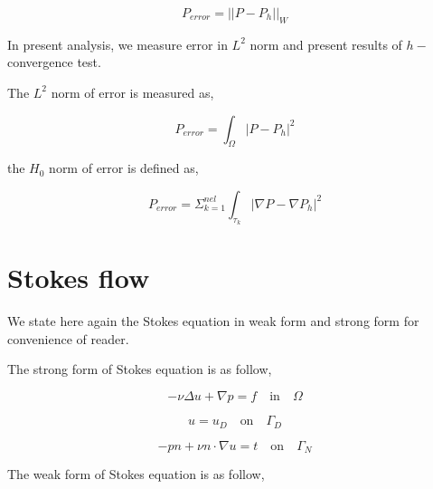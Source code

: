 \documentclass[a4paper,12pt]{book}
\begin{document}
\begin{equation} \label{error_definition}
P_{error} = ||P - P_h||_{W}
\end{equation}

In present analysis, we measure error in $L^2$ norm and present results of $h-$convergence test.

The $L^2$ norm of error is measured as,

\begin{equation}
P_{error} = \int_{\Omega} |P - P_h|^2
\end{equation}

the $H_0$ norm of error is defined as,

\begin{equation}
P_{error} = \Sigma_{k=1}^{nel} \int_{\tau_k} |\nabla P - \nabla P_h|^2
\end{equation}

\section{Stokes flow}\cite{white} \label{Stokes_flow}

We state here again the Stokes equation in weak form and strong form for convenience of reader.

The strong form of Stokes equation is as follow,

\begin{equation} \label{stokes_strong_form}
-\nu \Delta u + \nabla p = f \quad \textrm{in} \quad \Omega
\end{equation}

\begin{equation} \label{dirichlet condition stokes}
u = u_D \quad \textrm{on} \quad \Gamma_D
\end{equation}

\begin{equation} \label{neumann condition stokes}
-pn + \nu n \cdot \nabla u = t \quad \textrm{on} \quad \Gamma_N
\end{equation}

The weak form of Stokes equation is as follow,
\end{document}
